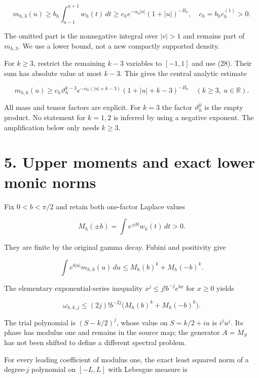 \documentclass[11pt,a4paper]{article}
\begin{document}
\[
 m_{h,3}(u)\ge
 b_h\int_{u-1}^{u+1}w_h(t)\,dt
 \ge c_h e^{-\alpha_0|u|}(1+|u|)^{-B_h},\quad c_h=b_hc_h^{(1)}>0.
                                                                         \tag{28}
\]

The omitted part is the nonnegative integral over \(|v|>1\) and remains
part of \(m_{h,3}\). We use a lower bound, not a new compactly supported
density.

For \(k\ge3\), restrict the remaining \(k-3\) variables to \([-1,1]\)
and use (28). Their sum has absolute value at most \(k-3\). This gives
the central analytic estimate

\[
 \boxed{
 m_{h,k}(u)\ge
 c_h\vartheta_h^{k-3}
 e^{-\alpha_0(|u|+k-3)}
 (1+|u|+k-3)^{-B_h}
 \quad(k\ge3,\ u\in\mathbb R).}                                       \tag{29}
\]

All mass and tensor factors are explicit. For \(k=3\) the factor
\(\vartheta_h^0\) is the empty product. No statement for \(k=1,2\) is
inferred by using a negative exponent. The amplification below only
needs \(k\ge3\).

\section{5. Upper moments and exact lower monic
norms}\label{upper-moments-and-exact-lower-monic-norms}

Fix \(0<b<\pi/2\) and retain both one-factor Laplace values

\[
 M_h(\pm b)=\int e^{\pm bt}w_h(t)\,dt>0.                               \tag{30}
\]

They are finite by the original gamma decay. Fubini and positivity give

\[
 \int e^{b|u|}m_{h,k}(u)\,du
 \le M_h(b)^k+M_h(-b)^k.                                                \tag{31}
\]

The elementary exponential-series inequality \(x^j\le j!b^{-j}e^{bx}\)
for \(x\ge0\) yields

\[
 \omega_{h,k,j}
 \le (2j)!b^{-2j}\bigl(M_h(b)^k+M_h(-b)^k\bigr).                       \tag{32}
\]

The trial polynomial is \((S-k/2)^j\), whose value on \(S=k/2+iu\) is
\(i^ju^j\). Its phase has modulus one and remains in the source map; the
generator \(A=M_S\) has not been shifted to define a different spectral
problem.

For every leading coefficient of modulus one, the exact least squared
norm of a degree-\(j\) polynomial on \([-L,L]\) with Lebesgue measure is
\end{document}
